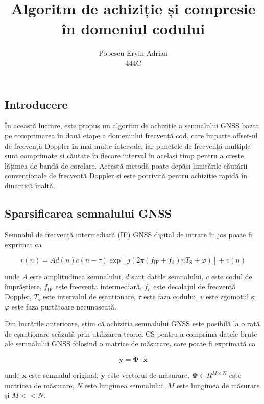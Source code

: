 \documentclass[10pt]{report}
\title{Algoritm de achiziție și compresie în domeniul codului }
\author{Popescu Ervin-Adrian\\444C}
\date{}
\begin{document}
\maketitle

\subsection*{Introducere}

În această lucrare, este propus un algoritm de achiziție a semnalului GNSS bazat pe comprimarea în două etape a domeniului frecvență cod, care împarte offset-ul de frecvență Doppler în mai multe intervale, iar punctele de frecvență multiple sunt comprimate și căutate în fiecare interval în același timp pentru a crește lățimea de bandă de corelare. Această metodă poate depăși limitările căutării convenționale de frecvență Doppler și este potrivită pentru achiziție rapidă în dinamică înaltă.


\subsection*{Sparsificarea semnalului GNSS}
Semnalul de frecvență intermediară (IF) GNSS digital de intrare în jos poate fi exprimat ca

\begin{equation}
    r(n)=A d(n) c(n-\tau) \exp \left[j\left(2 \pi\left(f_{\mathrm{IF}}+f_{\mathrm{d}}\right) n T_{\mathrm{S}}+\varphi\right)\right]+v(n)
    \label{eq:1}
\end{equation}

unde \(A\) este amplitudinea semnalului, \(d\) sunt datele semnalului, \(c\) este codul de împrăștiere, \(f_{\mathrm{IF}}\) este frecvența intermediară, \( f_{\mathrm{d}}\) este decalajul de frecvență Doppler, \(T_{\mathrm{s}}\) este intervalul de eșantionare, \(\tau\) este faza codului, \(v\) este zgomotul și \(\varphi\) este faza purtătoare necunoscută.

Din lucrările anterioare, știm că achiziția semnalului GNSS este posibilă la o rată de eșantionare scăzută prin utilizarea teoriei CS pentru a comprima datele brute ale semnalului GNSS folosind o matrice de măsurare, care poate fi exprimată ca

\begin{equation}
    \mathbf{y}=\boldsymbol{\Phi} \cdot \mathbf{x}
\end{equation}

unde \(\mathbf{x}\) este semnalul original, \(\mathbf{y}\) este vectorul de măsurare, \(\boldsymbol{\Phi} \in R^{M \times N}\) este matricea de măsurare, \(N\) este lungimea semnalului, \(M\) este lungimea de măsurare și \(M<<N\).
\end{document}
